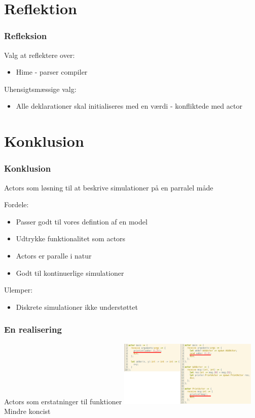 \section{Reflektion}
\begin{frame}
	\frametitle{Refleksion}
	Valg at reflektere over:
	  \begin{itemize}
	    \item{Hime - parser compiler}
	  \end{itemize}
  Uhensigtsmæssige valg:
	  \begin{itemize}
	    \item Alle deklarationer skal initialiseres med en værdi - konfliktede med actor
	  \end{itemize}
\end{frame}

\section{Konklusion}
\begin{frame}
	\frametitle{Konklusion}
	Actors som løsning til at beskrive simulationer på en parralel måde
	
	
  Fordele:
    \begin{itemize}
      \item Passer godt til vores defintion af en model
      \item Udtrykke funktionalitet som actors
      \item Actors er paralle i natur
      \item Godt til kontinuerlige simulationer
    \end{itemize}
  Ulemper:
    \begin{itemize}
      \item Diskrete simulationer ikke understøttet
    \end{itemize}
\end{frame}

\begin{frame}
	\frametitle{En realisering}
	Actors som erstatninger til funktioner
	\includegraphics[width=250px]{Images/actorFunc.png}\newline
	Mindre koncist
\end{frame}

